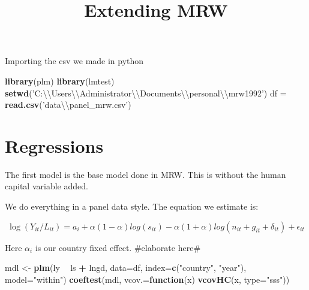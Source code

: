 \documentclass[]{article}
\title{Extending MRW}
\author{}
\date{}
\newenvironment{Shaded}{\begin{snugshade}}{\end{snugshade}}
\newcommand{\KeywordTok}[1]{\textcolor[rgb]{0.13,0.29,0.53}{\textbf{#1}}}
\newcommand{\DataTypeTok}[1]{\textcolor[rgb]{0.13,0.29,0.53}{#1}}
\newcommand{\CharTok}[1]{\textcolor[rgb]{0.31,0.60,0.02}{#1}}
\newcommand{\StringTok}[1]{\textcolor[rgb]{0.31,0.60,0.02}{#1}}
\newcommand{\ControlFlowTok}[1]{\textcolor[rgb]{0.13,0.29,0.53}{\textbf{#1}}}
\newcommand{\OperatorTok}[1]{\textcolor[rgb]{0.81,0.36,0.00}{\textbf{#1}}}
\newcommand{\NormalTok}[1]{#1}
\begin{document}
\maketitle

Importing the csv we made in python

\begin{Shaded}
\begin{Highlighting}[]
\KeywordTok{library}\NormalTok{(plm)}
\KeywordTok{library}\NormalTok{(lmtest)}
\KeywordTok{setwd}\NormalTok{(}\StringTok{'C:}\CharTok{\textbackslash{}\textbackslash{}}\StringTok{Users}\CharTok{\textbackslash{}\textbackslash{}}\StringTok{Administrator}\CharTok{\textbackslash{}\textbackslash{}}\StringTok{Documents}\CharTok{\textbackslash{}\textbackslash{}}\StringTok{personal}\CharTok{\textbackslash{}\textbackslash{}}\StringTok{mrw1992'}\NormalTok{)}
\NormalTok{df =}\StringTok{ }\KeywordTok{read.csv}\NormalTok{(}\StringTok{'data}\CharTok{\textbackslash{}\textbackslash{}}\StringTok{panel_mrw.csv'}\NormalTok{)}
\end{Highlighting}
\end{Shaded}

\section{Regressions}\label{regressions}

The first model is the base model done in MRW. This is without the human
capital variable added.

We do everything in a panel data style. The equation we estimate is:

\[\log(Y_{it}/L_{it})=a_i + \alpha(1 - \alpha)log(s_{it}) - \alpha(1 + \alpha)log(n_{it} + g_{it} + \delta_{it}) + \epsilon_{it}\]

Here \(\alpha_i\) is our country fixed effect. \#elaborate here\#

\begin{Shaded}
\begin{Highlighting}[]
\NormalTok{mdl <-}\StringTok{ }\KeywordTok{plm}\NormalTok{(ly }\OperatorTok{~}\StringTok{ }\NormalTok{ls }\OperatorTok{+}\StringTok{ }\NormalTok{lngd, }\DataTypeTok{data=}\NormalTok{df, }\DataTypeTok{index=}\KeywordTok{c}\NormalTok{(}\StringTok{"country"}\NormalTok{, }\StringTok{"year"}\NormalTok{), }\DataTypeTok{model=}\StringTok{"within"}\NormalTok{)}
\KeywordTok{coeftest}\NormalTok{(mdl, }\DataTypeTok{vcov.=}\ControlFlowTok{function}\NormalTok{(x) }\KeywordTok{vcovHC}\NormalTok{(x, }\DataTypeTok{type=}\StringTok{"sss"}\NormalTok{))}
\end{Highlighting}
\end{Shaded}
\end{document}
